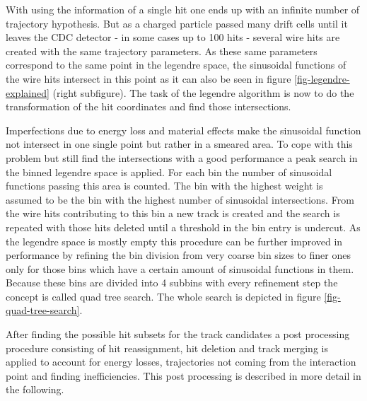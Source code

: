 With using the information of a single hit one ends up with an infinite number of trajectory hypothesis. But as a charged particle passed many drift cells until it leaves the CDC detector - in some cases up to 100 hits - several wire hits are created with the same trajectory parameters. As these same parameters correspond to the same point in the legendre space, the sinusoidal functions of the wire hits intersect in this point as it can also be seen in figure \ref{fig-legendre-explained} (right subfigure). The task of the legendre algorithm is now to do the transformation of the hit coordinates and find those intersections.

Imperfections due to energy loss and material effects make the sinusoidal function not intersect in one single point but rather in a smeared area. To cope with this problem but still find the intersections with a good performance a peak search in the binned legendre space is applied. For each bin the number of sinusoidal functions passing this area is counted. The bin with the highest weight is assumed to be the bin with the highest number of sinusoidal intersections. From the wire hits contributing to this bin a new track is created and the search is repeated with those hits deleted until a threshold in the bin entry is undercut. As the legendre space is mostly empty this procedure can be further improved in performance by refining the bin division from very coarse bin sizes to finer ones only for those bins which have a certain amount of sinusoidal functions in them. Because these bins are divided into 4 subbins with every refinement step the concept is called quad tree search. The whole search is depicted in figure \ref{fig-quad-tree-search}.

After finding the possible hit subsets for the track candidates a post processing procedure consisting of hit reassignment, hit deletion and track merging is applied to account for energy losses, trajectories not coming from the interaction point and finding inefficiencies. This post processing is described in more detail in the following.


